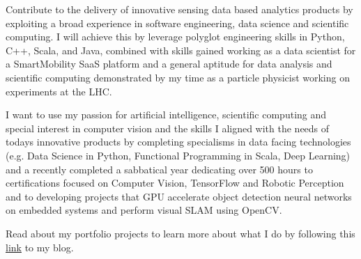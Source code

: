 

\begin{cvparagraph}


Contribute to the delivery of innovative sensing data based analytics products 
by exploiting a broad experience in software engineering, data science and 
scientific computing.
I will achieve this by leverage polyglot engineering skills in Python, C++, Scala, 
and Java, combined with skills gained working as a data scientist for a SmartMobility SaaS platform
and a general aptitude for data analysis and scientific computing demonstrated by my 
time as a particle physicist working on experiments at the LHC.

I want to use my passion for artificial intelligence, scientific 
computing and special interest in computer vision and the skills I 
aligned with the needs of todays 
innovative products by completing specialisms in data facing technologies 
(e.g. Data Science in Python, Functional Programming in Scala, Deep Learning)
and a recently completed a sabbatical year dedicating over 500 hours to certifications 
focused on Computer Vision, TensorFlow and Robotic Perception and to developing 
projects
that GPU accelerate object detection neural networks on embedded systems 
and perform visual SLAM using OpenCV. 

Read about my portfolio projects to learn more about what I do
by following this \href{https://presland.io}{\color{awesome-red}link} to my blog.

\end{cvparagraph}